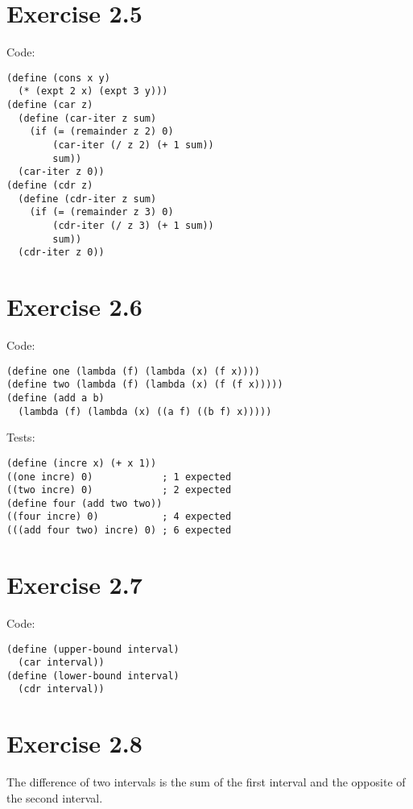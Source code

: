 \documentclass[../main.tex]{subfiles}
\begin{document}
\section{Exercise 2.5}

Code:

\begin{lstlisting}
(define (cons x y)
  (* (expt 2 x) (expt 3 y)))
(define (car z)
  (define (car-iter z sum)
    (if (= (remainder z 2) 0)
        (car-iter (/ z 2) (+ 1 sum))
        sum))
  (car-iter z 0))
(define (cdr z)
  (define (cdr-iter z sum)
    (if (= (remainder z 3) 0)
        (cdr-iter (/ z 3) (+ 1 sum))
        sum))
  (cdr-iter z 0))
\end{lstlisting}

\section{Exercise 2.6}

Code:

\begin{lstlisting}
(define one (lambda (f) (lambda (x) (f x))))
(define two (lambda (f) (lambda (x) (f (f x)))))
(define (add a b)
  (lambda (f) (lambda (x) ((a f) ((b f) x)))))
\end{lstlisting}

Tests:

\begin{lstlisting}
(define (incre x) (+ x 1))
((one incre) 0)            ; 1 expected
((two incre) 0)            ; 2 expected
(define four (add two two))
((four incre) 0)           ; 4 expected
(((add four two) incre) 0) ; 6 expected
\end{lstlisting}

\section{Exercise 2.7}

Code:

\begin{lstlisting}
(define (upper-bound interval)
  (car interval))
(define (lower-bound interval)
  (cdr interval))
\end{lstlisting}

\section{Exercise 2.8}

The difference of two intervals is the
 sum of the first interval and the opposite
 of the second interval.
\end{document}
